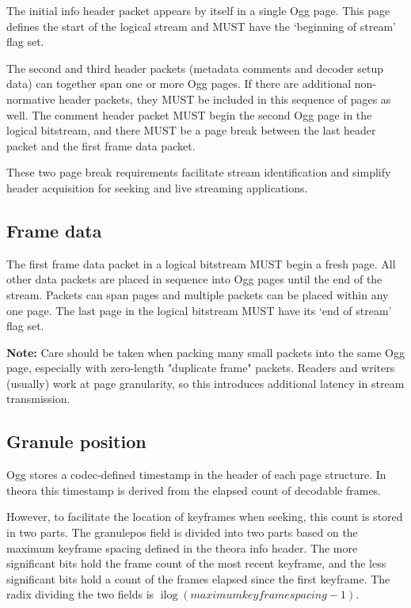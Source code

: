 \documentclass[9pt,letterpaper]{book}
\newcommand{\ilog}{\ensuremath{\mathop{\mathrm{ilog}}\nolimits}}
\numberwithin{equation}{chapter}
\numberwithin{figure}{chapter}
\numberwithin{table}{chapter}
\begin{document}
The initial info header packet appears by itself in a single Ogg page.
This page defines the start of the logical stream and MUST have
 the `beginning of stream' flag set.

The second and third header packets (metadata comments and decoder
 setup data) can together span one or more Ogg pages.
If there are additional non-normative header packets, they MUST be
 included in this sequence of pages as well.
The comment header packet MUST begin the second Ogg page in the logical
 bitstream, and there MUST be a page break between the last header
 packet and the first frame data packet.

These two page break requirements facilitate stream identification and
 simplify header acquisition for seeking and live streaming applications.

\subsection{Frame data}

The first frame data packet in a logical bitstream MUST begin a fresh page.
All other data packets are placed in sequence into Ogg pages
 until the end of the stream.
Packets can span pages and multiple packets can be placed within any
 one page.
The last page in the logical bitstream MUST have its `end of stream'
 flag set.

{\bf Note:} Care should be taken when packing many small packets into
 the same Ogg page, especially with zero-length "duplicate frame"
 packets. Readers and writers (usually) work at page granularity,
 so this introduces additional latency in stream transmission. 

\subsection{Granule position}

Ogg stores a codec-defined timestamp in the header of each page
 structure. In theora this timestamp is derived from the elapsed
 count of decodable frames.

However, to facilitate the location of keyframes when seeking, this
 count is stored in two parts. The granulepos field is divided into
 two parts based on the maximum keyframe spacing defined in the theora
 info header. The more significant bits hold the frame count of
 the most recent keyframe, and the less significant bits hold a
 count of the frames elapsed since the first keyframe. The radix
 dividing the two fields is $\ilog(maximum keyframe spacing - 1)$.
 
\end{document}
